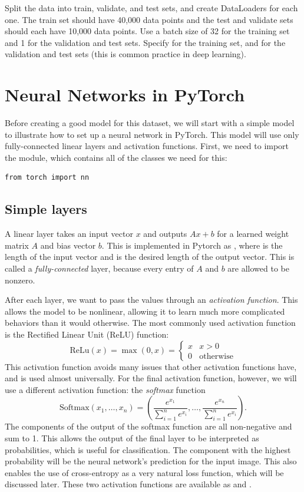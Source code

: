 \begin{problem}
Split the data into train, validate, and test sets, and create DataLoaders for each one. 
The train set should have 40,000 data points and the test and validate sets should each have 10,000 data points. 
Use a batch size of 32 for the training set and 1 for the validation and test sets.
Specify  for the training set, and  for the validation and test sets (this is common practice in deep learning).
\end{problem}

\section*{Neural Networks in PyTorch}
Before creating a good model for this dataset, we will start with a simple model to illustrate how to set up a neural network in PyTorch.
This model will use only fully-connected linear layers and activation functions.
First, we need to import the  module, which contains all of the classes we need for this:
\begin{lstlisting}
from torch import nn
\end{lstlisting}

\subsection*{Simple layers}
A linear layer takes an input vector \(x\) and outputs \(Ax+b\) for a learned weight matrix \(A\) and bias vector \(b\).
This is implemented in Pytorch as , where  is the length of the input vector and  is the desired length of the output vector.
This is called a \emph{fully-connected} layer, because every entry of \(A\) and \(b\) are allowed to be nonzero.

After each layer, we want to pass the values through an \emph{activation function}.
This allows the model to be nonlinear, allowing it to learn much more complicated behaviors than it would otherwise.
The most commonly used activation function is the Rectified Linear Unit (ReLU) function:
\[
\mathrm{ReLu}(x) = \max(0,x)=\begin{cases}
x  & x>0
\\
0 &\text{otherwise}
\end{cases}
\]
This activation function avoids many issues that other activation functions have, and is used almost universally.
For the final activation function, however, we will use a different activation function: the \emph{softmax} function
\[
\mathrm{Softmax}(x_1,\ldots,x_n)=\left(\frac{e^{x_1}}{\sum_{i=1}^n e^{x_i}},\ldots,\frac{e^{x_n}}{\sum_{i=1}^n e^{x_i}}\right).
\]
The components of the output of the softmax function are all non-negative and sum to 1.
This allows the output of the final layer to be interpreted as probabilities, which is useful for classification.
The component with the highest probability will be the neural network's prediction for the input image.
This also enables the use of cross-entropy as a very natural loss function, which will be discussed later.
These two activation functions are available as  and .

